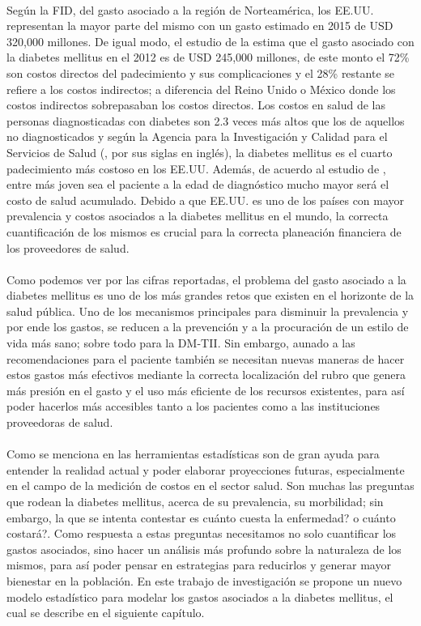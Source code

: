 \\   
Seg\'un la FID, del gasto asociado a la regi\'on de Norteam\'erica, los EE.UU. representan la mayor parte del mismo con un gasto estimado en 2015 de USD 320,000 millones. De igual modo, el estudio de la \cite{american2013economic} estima que el gasto asociado con la diabetes mellitus en el 2012 es de USD 245,000 millones, de este monto el 72\% son costos directos del padecimiento y sus complicaciones y el 28\% restante se refiere a los costos indirectos; a diferencia del Reino Unido o M\'exico donde los costos indirectos sobrepasaban los costos directos. Los costos en salud de las personas diagnosticadas con diabetes son 2.3 veces m\'as altos que los de aquellos no diagnosticados y seg\'un la Agencia para la Investigaci\'on y Calidad para el Servicios de Salud (\cite{MEPSSummary}, por sus siglas en ingl\'es), la diabetes mellitus es el cuarto padecimiento m\'as costoso en los EE.UU. Adem\'as, de acuerdo al estudio de \cite{zhuo2014lifetime}, entre m\'as joven sea el paciente a la edad de diagn\'ostico mucho mayor ser\'a el costo de salud acumulado. Debido a que EE.UU. es uno de los pa\'ises con mayor prevalencia y costos asociados a la diabetes mellitus en el mundo, la correcta cuantificaci\'on de los mismos es crucial para la correcta planeaci\'on financiera de los proveedores de salud.\\
\\
Como podemos ver por las cifras reportadas, el problema del gasto asociado a la diabetes mellitus es uno de los m\'as grandes retos que existen en el horizonte de la salud p\'ublica. Uno de los mecanismos principales para disminuir la prevalencia y por ende los gastos, se reducen a la prevenci\'on y a la procuraci\'on de un estilo de vida m\'as sano; sobre todo para la DM-TII. Sin embargo, aunado a las recomendaciones para el paciente tambi\'en se necesitan nuevas maneras de hacer estos gastos m\'as efectivos mediante la correcta localizaci\'on del rubro que genera m\'as presi\'on en el gasto y el uso m\'as eficiente de los recursos existentes, para as\'i poder hacerlos m\'as accesibles tanto a los pacientes como a las instituciones proveedoras de salud.\\
\\
Como se menciona en \cite{cichon1999modelling} las herramientas estad\'isticas son de gran ayuda para entender la realidad actual y poder elaborar proyecciones futuras, especialmente en el campo de la medici\'on de costos en el sector salud. Son muchas las preguntas que rodean la diabetes mellitus, acerca de su prevalencia, su morbilidad; sin embargo, la que se intenta contestar es cu\'anto cuesta la enfermedad? o cu\'anto costar\'a?. Como respuesta a estas preguntas necesitamos no solo cuantificar los gastos asociados, sino hacer un an\'alisis m\'as profundo sobre la naturaleza de los mismos, para as\'i poder pensar en estrategias para reducirlos y generar mayor bienestar en la poblaci\'on. En este trabajo de investigaci\'on se propone un nuevo modelo estad\'istico para modelar los gastos asociados a la diabetes mellitus, el cual se describe en el siguiente cap\'itulo.\\
\\
